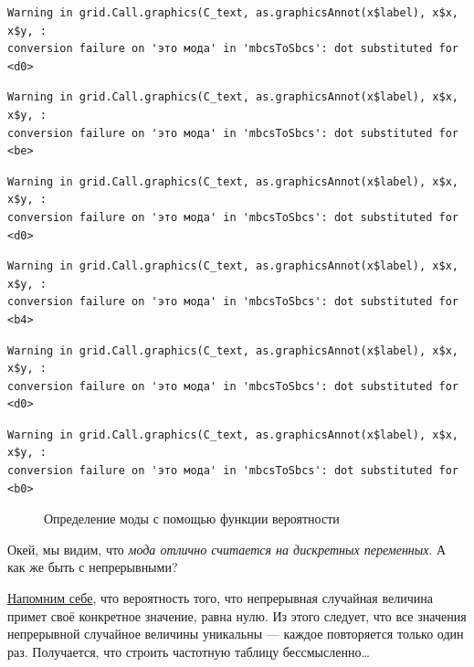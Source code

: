 \documentclass[
  letterpaper,
  DIV=11,
  numbers=noendperiod]{scrreprt}
\theoremstyle{definition}
\theoremstyle{remark}
\begin{document}
\begin{verbatim}
Warning in grid.Call.graphics(C_text, as.graphicsAnnot(x$label), x$x, x$y, :
conversion failure on 'это мода' in 'mbcsToSbcs': dot substituted for <d0>
\end{verbatim}

\begin{verbatim}
Warning in grid.Call.graphics(C_text, as.graphicsAnnot(x$label), x$x, x$y, :
conversion failure on 'это мода' in 'mbcsToSbcs': dot substituted for <be>
\end{verbatim}

\begin{verbatim}
Warning in grid.Call.graphics(C_text, as.graphicsAnnot(x$label), x$x, x$y, :
conversion failure on 'это мода' in 'mbcsToSbcs': dot substituted for <d0>
\end{verbatim}

\begin{verbatim}
Warning in grid.Call.graphics(C_text, as.graphicsAnnot(x$label), x$x, x$y, :
conversion failure on 'это мода' in 'mbcsToSbcs': dot substituted for <b4>
\end{verbatim}

\begin{verbatim}
Warning in grid.Call.graphics(C_text, as.graphicsAnnot(x$label), x$x, x$y, :
conversion failure on 'это мода' in 'mbcsToSbcs': dot substituted for <d0>
\end{verbatim}

\begin{verbatim}
Warning in grid.Call.graphics(C_text, as.graphicsAnnot(x$label), x$x, x$y, :
conversion failure on 'это мода' in 'mbcsToSbcs': dot substituted for <b0>
\end{verbatim}

\begin{figure}


\caption{\label{fig-mode-pmf}Определение моды с помощью функции
вероятности}

\end{figure}%

Окей, мы видим, что \emph{мода отлично считается на дискретных
переменных}. А как же быть с непрерывными?

\href{}{Напомним себе}, что вероятность того, что непрерывная случайная
величина примет своё конкретное значение, равна нулю. Из этого следует,
что все значения непрерывной случайное величины уникальны --- каждое
повторяется только один раз. Получается, что строить частотную таблицу
бессмысленно\ldots{}
\end{document}
